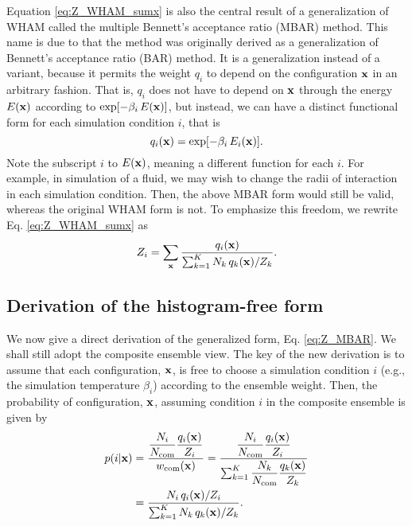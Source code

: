 \documentclass[aip,jcp,preprint,superscriptaddress]{revtex4-1}
\begin{document}
Equation \eqref{eq:Z_WHAM_sumx}
is also the central result of
a generalization of WHAM called
the multiple Bennett's acceptance ratio (MBAR) method\cite{shirts2008}.
%
This name is due to that the method
was originally derived as a generalization of
Bennett's acceptance ratio (BAR) method\cite{bennett1976}.
%
It is a generalization
instead of a variant, because it permits
the weight $q_i$ to depend on the configuration $\mathbf{x}$
in an arbitrary fashion.
%
That is, $q_i$ does not have to depend on $\mathbf{x}$
through the energy $E(\mathbf{x})$ according to
$\exp[-\beta_i \, E(\mathbf{x})]$,
but instead,
we can have a distinct functional form
for each simulation condition $i$, that is
\[
  q_i(\mathbf{x}) = \exp[-\beta_i \, E_i(\mathbf{x})].
\]
Note the subscript $i$ to $E(\mathbf{x})$,
meaning a different function for each $i$.
%
For example,
in simulation of a fluid,
we may wish to change the radii of interaction
in each simulation condition.
%
Then, the above MBAR form would still be valid,
whereas the original WHAM form is not.
%
To emphasize this freedom,
we rewrite Eq. \eqref{eq:Z_WHAM_sumx} as
\begin{equation}
  Z_i
  =
  \sum_{\mathbf{x}}
  \frac{ q_i(\mathbf{x}) }
  { \sum_{k = 1}^K N_k \, q_k(\mathbf{x}) / Z_k }.
  \label{eq:Z_MBAR}
\end{equation}



\subsection{Derivation of the histogram-free form}



We now give a direct derivation
of the generalized form, Eq. \eqref{eq:Z_MBAR}.
%
We shall still adopt the composite ensemble view.
%
The key of the new derivation is to assume that
each configuration, $\mathbf{x}$, is free to choose
a simulation condition $i$ (e.g., the simulation temperature $\beta_i$)
according to the ensemble weight.
%
Then, the probability of configuration, $\mathbf{x}$,
assuming condition $i$ in the composite ensemble
is given by
%
\begin{align}
  p(i|\mathbf{x})
  &=
  \frac{ \dfrac{N_i}{N_{\mathrm{com}}} \dfrac{q_i(\mathbf{x})}{Z_i} }
  { w_{\mathrm{com}}(\mathbf{x}) }
  =
  \frac{ \dfrac{N_i}{N_{\mathrm{com}}} \dfrac{q_i(\mathbf{x})}{Z_i} }
  { \sum_{k = 1}^K \dfrac{N_k}{N_{\mathrm{com}}} \dfrac{q_k(\mathbf{x})}{Z_k} }
  \notag \\
  &=
  \frac{ N_i \, q_i(\mathbf{x}) / Z_i }
  { \sum_{k = 1}^K N_k \, q_k(\mathbf{x}) / Z_k }.
  \label{eq:pix_MBAR}
\end{align}
\end{document}
